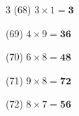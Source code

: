 \documentclass[a4paper, 11pt]{ltjsarticle}
\begin{document}
\begin{multicols*}{3}
\noindent (68) \quad $3 \times 1 = \mathbf{3}$
\vspace*{\fill}

\noindent (69) \quad $4 \times 9 = \mathbf{36}$
\vspace*{\fill}

\noindent (70) \quad $6 \times 8 = \mathbf{48}$
\vspace*{\fill}

\noindent (71) \quad $9 \times 8 = \mathbf{72}$
\vspace*{\fill}

\noindent (72) \quad $8 \times 7 = \mathbf{56}$
\vspace*{\fill}

\end{multicols*}
\end{document}

